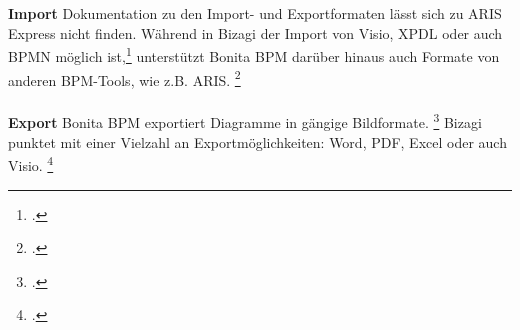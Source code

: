 \begin{figure}[H]
\begin{minipage}{\linewidth}
\begin{center}
\end{center}
\end{minipage}
\end{figure}
\\
\\
\textbf{Import} Dokumentation zu den Import- und Exportformaten lässt sich zu
ARIS Express nicht finden. Während in Bizagi der Import von Visio, XPDL oder
auch BPMN möglich ist,\footcite{bizagiimport} unterstützt Bonita BPM darüber
hinaus auch Formate von anderen BPM-Tools, wie z.B. ARIS.
\footcite{bonitaimportexport}
\\
\\
\textbf{Export} Bonita BPM exportiert Diagramme in gängige Bildformate.
\footcite{bonitaimportexport} Bizagi punktet mit einer Vielzahl an
Exportmöglichkeiten: Word, PDF, Excel oder auch Visio.
\footcite{bizagiexport}

\begin{figure}[H]
\begin{minipage}{\linewidth}
\begin{center}
\end{center}
\end{minipage}
\end{figure}

